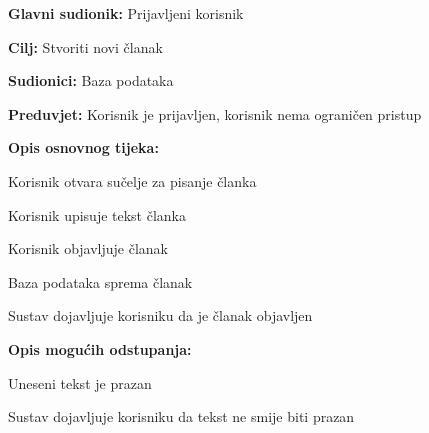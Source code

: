 \noindent {}
\begin{packed_item}

\item \textbf{Glavni sudionik:} Prijavljeni korisnik
\item  \textbf{Cilj:} Stvoriti novi članak
\item  \textbf{Sudionici:} Baza podataka
\item  \textbf{Preduvjet:} Korisnik je prijavljen, korisnik nema ograničen pristup
\item  \textbf{Opis osnovnog tijeka:}

\item[] \begin{packed_enum}

    \item Korisnik otvara sučelje za pisanje članka
    \item Korisnik upisuje tekst članka
    \item Korisnik objavljuje članak
    \item Baza podataka sprema članak
    \item Sustav dojavljuje korisniku da je članak objavljen

\end{packed_enum}

\item  \textbf{Opis mogućih odstupanja:}

\item[] \begin{packed_item}

    \item[3.a] Uneseni tekst je prazan

    \item[] \begin{packed_enum}

        \item Sustav dojavljuje korisniku da tekst ne smije biti prazan

    \end{packed_enum}

\end{packed_item}

\end{packed_item}

